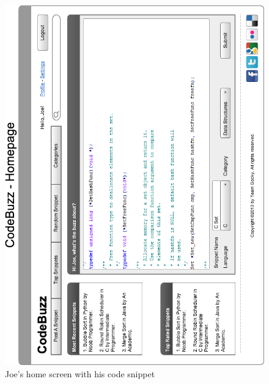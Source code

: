 \documentclass[11pt,a4paper]{article}
\begin{document}
\begin{figure}
\includegraphics[width=\textwidth]{../imgs/CCodeSnippetHorz.png}
\caption{Joe's home screen with his code snippet}
\label{fig:joe}
\end{figure}
\end{document}
